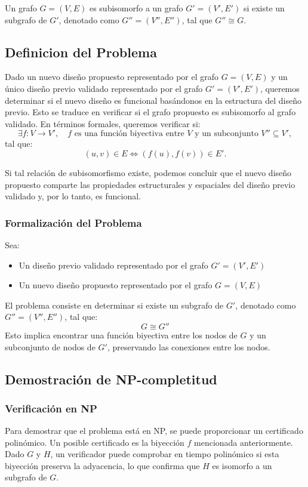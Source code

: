 \documentclass[12pt,a4paper]{article}
\begin{document}
Un grafo $G=(V,E)$ es subisomorfo a un grafo $G'=(V',E')$ si existe un subgrafo de $G'$, denotado como $G''=(V'',E'')$, tal que $G''\cong G$.
\subsection{Definicion del Problema}

Dado un nuevo diseño propuesto representado por el grafo $G=(V,E)$ y un único diseño previo validado representado por el grafo $G'=(V',E')$, queremos determinar si el nuevo diseño es funcional basándonos en la estructura del diseño previo. Esto se traduce en verificar si el grafo propuesto es subisomorfo al grafo validado. En términos formales, queremos verificar si:
\[
\exists f:V\rightarrow V', \quad f \text{ es una función biyectiva entre } V \text{ y un subconjunto } V''\subseteq V',
\]
tal que:
\[
(u,v)\in E \Longleftrightarrow (f(u),f(v))\in E'.
\]

Si tal relación de subisomorfismo existe, podemos concluir que el nuevo diseño propuesto comparte las propiedades estructurales y espaciales del diseño previo validado y, por lo tanto, es funcional.

\subsubsection{Formalización del Problema}

Sea:

\begin{itemize}
    \item Un diseño previo validado representado por el grafo $G'=(V',E')$
    \item Un nuevo diseño propuesto representado por el grafo $G=(V,E)$
\end{itemize}

El problema consiste en determinar si existe un subgrafo de $G'$, denotado como $G''=(V'',E'')$, tal que:
\[
G \cong G''
\]
Esto implica encontrar una función biyectiva entre los nodos de $G$ y un subconjunto de nodos de $G'$, preservando las conexiones entre los nodos.
\subsection{Demostración de NP-completitud}

\subsubsection{Verificación en NP}
Para demostrar que el problema está en NP, se puede proporcionar un certificado polinómico. Un posible certificado es la biyección $f$ mencionada anteriormente. Dado $G$ y $H$, un verificador puede comprobar en tiempo polinómico si esta biyección preserva la adyacencia, lo que confirma que $H$ es isomorfo a un subgrafo de $G$.
\end{document}

